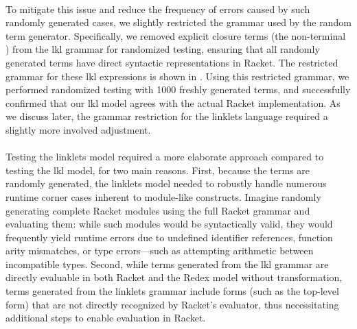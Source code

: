 			\paragraph{}%
				To mitigate this issue and reduce the frequency of errors caused by such randomly generated cases, we slightly restricted the grammar used by the random term generator. Specifically, we removed explicit closure terms (the non-terminal ) from the \gls{lkl} grammar for randomized testing, ensuring that all randomly generated terms have direct syntactic representations in Racket. The restricted grammar for these \gls{lkl} expressions is shown in . Using this restricted grammar, we performed randomized testing with 1000 freshly generated terms, and successfully confirmed that our \gls{lkl} model agrees with the actual Racket implementation. As we discuss later, the grammar restriction for the linklets language required a slightly more involved adjustment.

			\paragraph{}%
				Testing the linklets model required a more elaborate approach compared to testing the \gls{lkl} model, for two main reasons. First, because the terms are randomly generated, the linklets model needed to robustly handle numerous runtime corner cases inherent to module-like constructs. Imagine randomly generating complete Racket modules using the full Racket grammar and evaluating them: while such modules would be syntactically valid, they would frequently yield runtime errors due to undefined identifier references, function arity mismatches, or type errors—such as attempting arithmetic between incompatible types. Second, while terms generated from the \gls{lkl} grammar are directly evaluable in both Racket and the Redex model without transformation, terms generated from the linklets grammar include forms (such as the top-level  form) that are not directly recognized by Racket’s evaluator, thus necessitating additional steps to enable evaluation in Racket.


